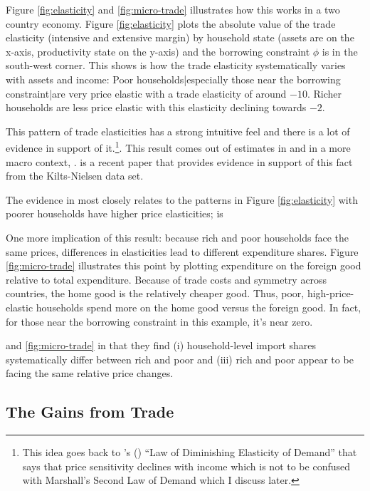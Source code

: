 \documentclass[12pt,pdftex]{article}
\def\citeapos#1{\citeauthor{#1}'s (\citeyear{#1})}
\begin{document}
\begin{onehalfspacing}
Figure \ref{fig:elasticity} and \ref{fig:micro-trade} illustrates how this works in a two country economy. Figure \ref{fig:elasticity} plots the absolute value of the trade elasticity (intensive and extensive margin) by household state (assets are on the x-axis, productivity state on the y-axis) and the borrowing constraint $\phi$ is in the south-west corner. This shows is how the trade elasticity systematically varies with assets and income: Poor households|especially those near the borrowing constraint|are very price elastic with a trade elasticity of around $-10$. Richer households are less price elastic with this elasticity declining towards $-2.$

This pattern of trade elasticities has a strong intuitive feel and there is a lot of evidence in support of it.\footnote{This idea goes back to \citeapos{harrod1936trade} ``Law of Diminishing Elasticity of Demand'' that says that price sensitivity declines with income which is not to be confused with Marshall's Second Law of Demand which I discuss later.}. This result comes out of estimates in \citet{berry1995automobile} and in a more macro context, \citet{nakamura2010accounting}. \citet{sangani2022markups} is a recent paper that provides evidence in support of this fact from the Kilts-Nielsen data set.


The evidence in \citet*{auer2022unequal} most closely relates to the patterns in Figure \ref{fig:elasticity} with poorer households have higher price elasticities; \citet*{colicev2022impact} is

One more implication of this result: because rich and poor households face the same prices, differences in elasticities lead to different expenditure shares. Figure \ref{fig:micro-trade} illustrates this point by plotting expenditure on the foreign good relative to total expenditure. Because of trade costs and symmetry across countries, the home good is the relatively cheaper good. Thus, poor, high-price-elastic households spend more on the home good versus the foreign good. In fact, for those near the borrowing constraint in this example, it's near zero.

  and \ref{fig:micro-trade} in that they find (i) household-level import shares systematically differ between rich and poor  and (iii) rich and poor appear to be facing the same relative price changes.

\subsection{The Gains from Trade}


\end{onehalfspacing}
\end{document}
